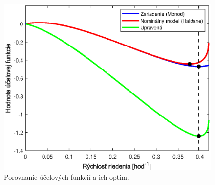 \begin{figure}
	\centering
	\includegraphics[width=0.7\linewidth]{images/mas_costFun_compar}
	\caption{Porovnanie účelových funkcií a ich optím.}
	\label{fig:mas_costFun_compar}
\end{figure}

